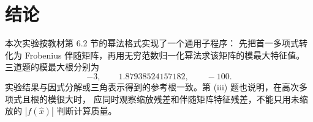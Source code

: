 \documentclass[a4paper,11pt]{article}
\begin{document}
\section{结论}
本次实验按教材第 6.2 节的幂法格式实现了一个通用子程序：
先把首一多项式转化为 Frobenius 伴随矩阵，再用无穷范数归一化幂法求该矩阵的模最大特征值。
三道题的模最大根分别为
\[
    -3,\qquad 1.87938524157182,\qquad -100.
\]
实验结果与因式分解或三角表示得到的参考根一致。第 (iii) 题也说明，在高次多项式且根的模很大时，
应同时观察缩放残差和伴随矩阵特征残差，不能只用未缩放的 $|f(\hat x)|$ 判断计算质量。
\end{document}

